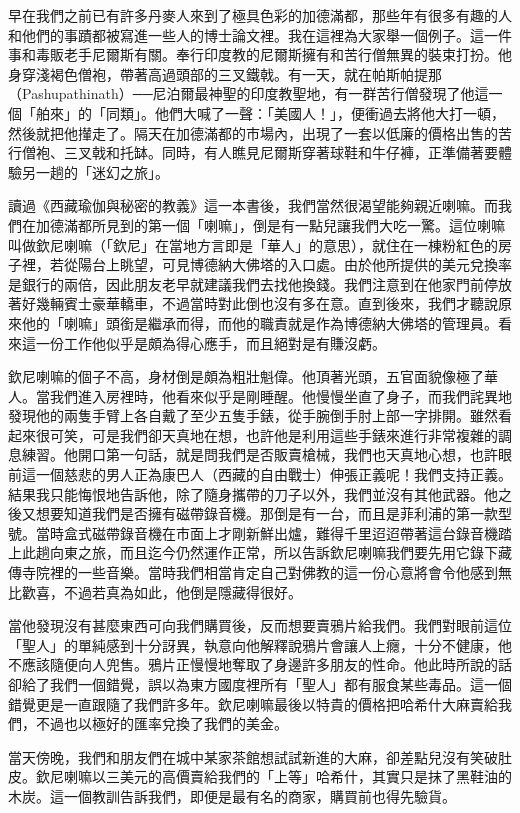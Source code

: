 早在我們之前已有許多丹麥人來到了極具色彩的加德滿都，那些年有很多有趣的人和他們的事蹟都被寫進一些人的博士論文裡。我在這裡為大家舉一個例子。這一件事和毒販老手尼爾斯有關。奉行印度教的尼爾斯擁有和苦行僧無異的裝束打扮。他身穿淺褐色僧袍，帶著高過頭部的三叉鐵戟。有一天，就在帕斯帕提那（Pashupathinath）──尼泊爾最神聖的印度教聖地，有一群苦行僧發現了他這一個「舶來」的「同類」。他們大喊了一聲：「美國人！」，便衝過去將他大打一頓，然後就把他攆走了。隔天在加德滿都的市場內，出現了一套以低廉的價格出售的苦行僧袍、三叉戟和托缽。同時，有人瞧見尼爾斯穿著球鞋和牛仔褲，正準備著要體驗另一趟的「迷幻之旅」。

讀過《西藏瑜伽與秘密的教義》這一本書後，我們當然很渴望能夠親近喇嘛。而我們在加德滿都所見到的第一個「喇嘛」，倒是有一點兒讓我們大吃一驚。這位喇嘛叫做欽尼喇嘛（「欽尼」在當地方言即是「華人」的意思），就住在一棟粉紅色的房子裡，若從陽台上眺望，可見博德納大佛塔的入口處。由於他所提供的美元兌換率是銀行的兩倍，因此朋友老早就建議我們去找他換錢。我們注意到在他家門前停放著好幾輛賓士豪華轎車，不過當時對此倒也沒有多在意。直到後來，我們才聽說原來他的「喇嘛」頭銜是繼承而得，而他的職責就是作為博德納大佛塔的管理員。看來這一份工作他似乎是頗為得心應手，而且絕對是有賺沒虧。

欽尼喇嘛的個子不高，身材倒是頗為粗壯魁偉。他頂著光頭，五官面貌像極了華人。當我們進入房裡時，他看來似乎是剛睡醒。他慢慢坐直了身子，而我們詫異地發現他的兩隻手臂上各自戴了至少五隻手錶，從手腕倒手肘上部一字排開。雖然看起來很可笑，可是我們卻天真地在想，也許他是利用這些手錶來進行非常複雜的調息練習。他開口第一句話，就是問我們是否販賣槍械，我們也天真地心想，也許眼前這一個慈悲的男人正為康巴人（西藏的自由戰士）伸張正義呢！我們支持正義。結果我只能悔恨地告訴他，除了隨身攜帶的刀子以外，我們並沒有其他武器。他之後又想要知道我們是否擁有磁帶錄音機。那倒是有一台，而且是菲利浦的第一款型號。當時盒式磁帶錄音機在市面上才剛新鮮出爐，難得千里迢迢帶著這台錄音機踏上此趟向東之旅，而且迄今仍然運作正常，所以告訴欽尼喇嘛我們要先用它錄下藏傳寺院裡的一些音樂。當時我們相當肯定自己對佛教的這一份心意將會令他感到無比歡喜，不過若真為如此，他倒是隱藏得很好。

當他發現沒有甚麼東西可向我們購買後，反而想要賣鴉片給我們。我們對眼前這位「聖人」的單純感到十分訝異，執意向他解釋說鴉片會讓人上癮，十分不健康，他不應該隨便向人兜售。鴉片正慢慢地奪取了身邊許多朋友的性命。他此時所說的話卻給了我們一個錯覺，誤以為東方國度裡所有「聖人」都有服食某些毒品。這一個錯覺更是一直跟隨了我們許多年。欽尼喇嘛最後以特貴的價格把哈希什大麻賣給我們，不過也以極好的匯率兌換了我們的美金。

當天傍晚，我們和朋友們在城中某家茶館想試試新進的大麻，卻差點兒沒有笑破肚皮。欽尼喇嘛以三美元的高價賣給我們的「上等」哈希什，其實只是抹了黑鞋油的木炭。這一個教訓告訴我們，即便是最有名的商家，購買前也得先驗貨。

